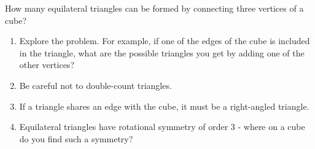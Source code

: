 \question
{}

How many equilateral triangles can be formed by connecting three vertices of a cube?

\begin{hints}
	\begin{enumerate}
		\item Explore the problem. For example, if one of the edges of the cube is included in the triangle, what are the possible triangles you get by adding one of the other vertices?
		\item Be careful not to double-count triangles.
		\item If a triangle shares an edge with the cube, it must be a right-angled triangle.
		\item Equilateral triangles have rotational symmetry of order 3 - where on a cube do you find such a symmetry?
	\end{enumerate}
\end{hints}

